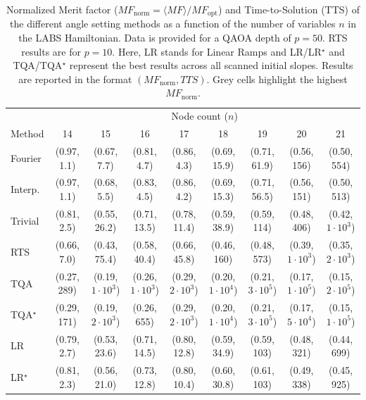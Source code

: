 \documentclass[twocolumn,
english,
aps,
pra,
10pt,
longbibliography,
superscriptaddress,
amsmath,
amssymb,
floatfix
]{revtex4-2}
\begin{document}
{\begin{table}[t]
\centering
\caption{
Normalized Merit factor ($MF_{\text{norm}} = \langle MF \rangle / MF_{\text{opt}}$) and Time-to-Solution (TTS) of the different angle setting methods as a function of the number of variables $n$ in the LABS Hamiltonian. 
Data is provided for a QAOA depth of $p=50$. 
RTS results are for $p=10$. 
Here, LR stands for Linear Ramps and LR/LR$^\star$ and TQA/TQA$^\star$ represent the best results across all scanned initial slopes.
Results are reported in the format $(MF_{\text{norm}}, TTS)$.
Grey cells highlight the highest $MF_{\text{norm}}$.
}
\label{tab:labs_mftts}
\footnotesize
\setlength{\tabcolsep}{4.5pt} 
\begin{tabular}{l *{8}{c}}
\hline\hline
& \multicolumn{8}{c}{Node count ($n$)} \\
Method & 14 & 15 & 16 & 17 & 18 & 19 & 20 & 21 \\ 
\midrule
Fourier     & (0.97, 1.1) & (0.67, 7.7) & (0.81, 4.7) & (0.86, 4.3) & (0.69, 15.9)  & (0.71, 61.9) & (0.56, 156) & (0.50, 554) \\
Interp.      & \cellcolor[HTML]{C0C0C0}(0.97, 1.1) & \cellcolor[HTML]{C0C0C0}(0.68, 5.5) & \cellcolor[HTML]{C0C0C0}(0.83, 4.5) & \cellcolor[HTML]{C0C0C0}(0.86, 4.2) & \cellcolor[HTML]{C0C0C0}(0.69, 15.3) & \cellcolor[HTML]{C0C0C0}(0.71, 56.5) & \cellcolor[HTML]{C0C0C0}(0.56, 151) & \cellcolor[HTML]{C0C0C0}(0.50, 513) \\
Trivial     & (0.81, 2.5) & (0.55, 26.2) & (0.71, 13.5) & (0.78, 11.4) & (0.59, 38.9)         & (0.59, 114)  & (0.48, 406) & (0.42, $1 \cdot 10^3$) \\
RTS         & (0.66, 7.0) & (0.43, 75.4) & (0.58, 40.4) & (0.66, 45.8) & (0.46,   160)       & (0.48, 573)  & (0.39, $1 \cdot 10^3$) & (0.35, $2 \cdot 10^3$) \\
TQA         & (0.27, 289) & (0.19, $1 \cdot 10^3$) & (0.26, $1 \cdot 10^3$) & (0.29, $2 \cdot 10^3$) & (0.20, $1 \cdot 10^4$) & (0.21, $3 \cdot 10^5$) & (0.17, $1 \cdot 10^5$) & (0.15, $2 \cdot 10^5$) \\
TQA$^\star$ & (0.29, 171) & (0.19, $2 \cdot 10^3$) & (0.26, 655) & (0.29, $2 \cdot 10^3$) & (0.20, $1 \cdot 10^4$) & (0.21, $3 \cdot 10^5$) & (0.17, $5 \cdot 10^4$) & (0.15, $1 \cdot 10^5$) \\
LR          & (0.79, 2.7) & (0.53, 23.6) & (0.71, 14.5) & (0.80, 12.8) & (0.59, 34.9) & (0.59, 103) & (0.48, 321) & (0.44, 699) \\
LR$^\star$  & (0.81, 2.3) & (0.56, 21.0) & (0.73, 12.8) & (0.80, 10.4) & (0.60, 30.8) & (0.61, 103) & (0.49, 338) & (0.45, 925) \\ 
\hline \hline
\end{tabular}
\end{table}


}
\end{document}
